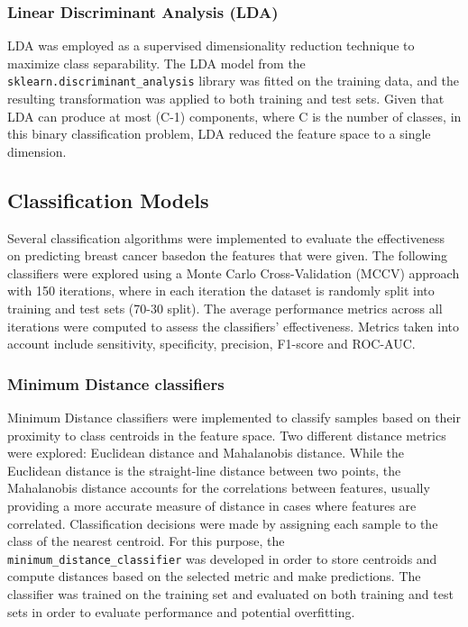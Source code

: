 \documentclass[12pt,a4paper]{article}
\begin{document}
\subsubsection{Linear Discriminant Analysis (LDA)}
LDA was employed as a supervised dimensionality reduction technique to maximize class separability. The LDA model from the \texttt{sklearn.discriminant\_analysis} library was fitted on the training data, and the resulting transformation was applied to both training and test sets. Given that LDA can produce at most (C-1) components, where C is the number of classes, in this binary classification problem, LDA reduced the feature space to a single dimension.

\subsection{Classification Models}
\label{subsec:classification_models}
Several classification algorithms were implemented to evaluate the effectiveness on predicting breast cancer basedon the features that were given. The following classifiers were explored using a Monte Carlo Cross-Validation (MCCV) approach with 150 iterations, where in each iteration the dataset is randomly split into training and test sets (70-30 split). The average performance metrics across all iterations were computed to assess the classifiers' effectiveness. Metrics taken into account include sensitivity, specificity, precision, F1-score and ROC-AUC.

\subsubsection{Minimum Distance classifiers}
Minimum Distance classifiers were implemented to classify samples based on their proximity to class centroids in the feature space. Two different distance metrics were explored: Euclidean distance and Mahalanobis distance. While the Euclidean distance is the straight-line distance between two points, the Mahalanobis distance accounts for the correlations between features, usually providing a more accurate measure of distance in cases where features are correlated. Classification decisions were made by assigning each sample to the class of the nearest centroid. For this purpose, the \texttt{minimum\_distance\_classifier} was developed in order to store centroids and compute distances based on the selected metric and make predictions. The classifier was trained on the training set and evaluated on both training and test sets in order to evaluate performance and potential overfitting.
\end{document}
